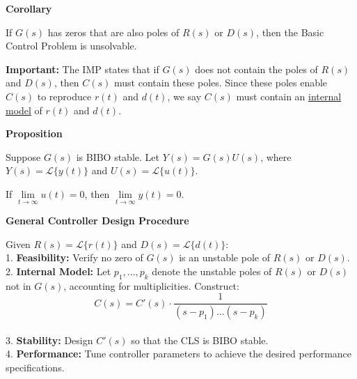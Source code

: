 \documentclass[5pt]{extarticle} %
\begin{document}
\begin{paracol}{3}
{    \textbf{Corollary}

    If $G(s)$ has zeros that are also poles of $R(s)$ or $D(s)$, then the Basic Control Problem is unsolvable.

    \textbf{Important:} The IMP states that if $G(s)$ does not contain the poles of $R(s)$ and $D(s)$, then $C(s)$ must contain these poles. Since these poles enable $C(s)$ to reproduce $r(t)$ and $d(t)$, we say $C(s)$ must contain an \underline{internal model} of $r(t)$ and $d(t)$.

    \textbf{Proposition}

    Suppose $G(s)$ is BIBO stable. Let $Y(s) = G(s) U(s)$, where $Y(s) = \mathcal{L}\{ y(t) \}$ and $U(s) = \mathcal{L}\{ u(t) \}$.

    If $\lim\limits_{t \to \infty} u(t) = 0$, then $\lim\limits_{t \to \infty} y(t) = 0$.

    \textbf{General Controller Design Procedure}
    
    Given $R(s) = \mathcal{L}\{ r(t) \}$ and $D(s) = \mathcal{L}\{ d(t) \}$: \\
    1. \textbf{Feasibility:} Verify no zero of $G(s)$ is an unstable pole of $R(s)$ or $D(s)$. \\
    2. \textbf{Internal Model:} Let $p_1, \dots, p_k$ denote the unstable poles of $R(s)$ or $D(s)$ not in $G(s)$, accounting for multiplicities. Construct:
    \[ C(s) = C'(s) \cdot \frac{1}{(s - p_1) \dots (s - p_k)} \] \\
    3. \textbf{Stability:} Design $C'(s)$ so that the CLS is BIBO stable. \\
    4. \textbf{Performance:} Tune controller parameters to achieve the desired performance specifications.



        }
\end{paracol}
\end{document}
